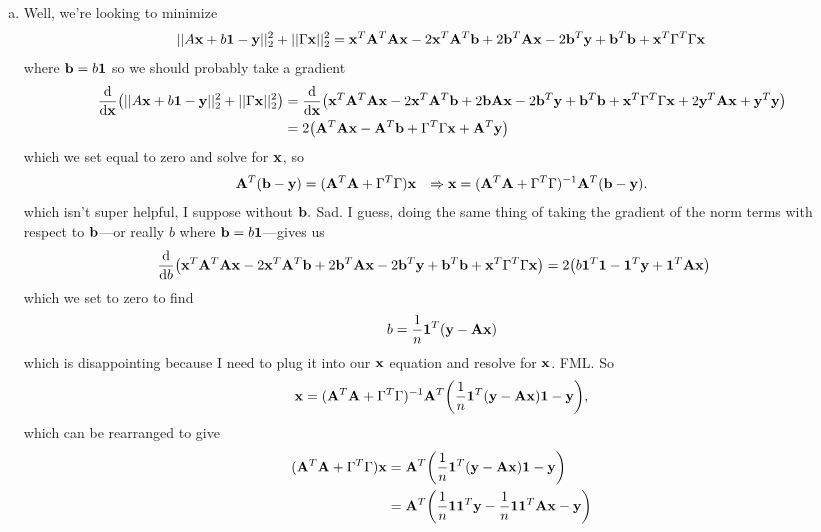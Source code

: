 \documentclass[12pt,letterpaper]{hmcpset}
\begin{document}
\begin{solution}
\begin{enumerate}[(a)]
		\item Well, we're looking to minimize \[ 
		||A{\bf x} + b{\bf 1} - {\bf y}||_2^2 + ||\Gamma{\bf x}||_2^2 = 
			\vb x^T \vb A^T \vb A \vb x - 2 \vb x^T \vb A^T \vb b 
			+2 \vb b^T \vb A \vb x - 2\vb b^T \vb y
			+ \vb b^T \vb b + \vb x^T \Gamma^T \Gamma \vb x
		\] where $\vb b = b \vb 1$ so we should probably take a gradient
		\begin{align*}
		 	\dv{\vb x}\qty (||A{\bf x} + b{\bf 1} - {\bf y}||_2^2 + ||\Gamma{\bf x}||_2^2) &= \dv{\vb x}\qty(\vb x^T \vb A^T \vb A \vb x - 2 \vb x^T \vb A^T \vb b 
			+2 \vb b \vb A \vb x - 2\vb b^T \vb y
			+ \vb b^T \vb b + \vb x^T \Gamma^T \Gamma \vb x + 2 \vb y^T \vb A \vb x + \vb y^T \vb y) \\
			&= 2 \qty(\vb A^T \vb A \vb x - \vb A^T \vb b + \Gamma^T \Gamma \vb x + \vb A^T \vb y) 
		 \end{align*} 
		 which we set equal to zero and solve for $\vb x$, so 
		 \begin{align*}
		 	&\vb A^T(\vb b - \vb y)  = (\vb A^T \vb A + \Gamma^T \Gamma)\vb x 
		 	&\Rightarrow \vb x = (\vb A^T \vb A + \Gamma^T \Gamma)^{-1}\vb A^T(\vb b - \vb y).
		 \end{align*}
		 which isn't super helpful, I suppose without $\vb b.$ Sad. I guess, doing the same thing of taking the gradient of the norm terms with respect to $\vb b$---or really $b$ where $\vb b = b \vb 1$---gives us
		 \begin{align*}
		 	\dv{b}\qty( \vb x^T \vb A^T \vb A \vb x - 2 \vb x^T \vb A^T \vb b 
			+2 \vb b^T \vb A \vb x - 2\vb b^T \vb y
			+ \vb b^T \vb b + \vb x^T \Gamma^T \Gamma \vb x ) 
			 &= 2\qty( b \vb 1^T \vb 1 - \vb 1^T \vb y + \vb 1^T \vb A \vb x )
		 \end{align*}
		 which we set to zero to find 
		 \begin{align*}
		 	 b = \frac1n \vb 1^T(\vb y - \vb A \vb x)
		 \end{align*}
		 which is disappointing because I need to plug it into our $\vb x$ equation and resolve for $\vb x$. FML.  So 
		 \begin{align*}
		 	\vb x = (\vb A^T \vb A + \Gamma^T \Gamma)^{-1} \vb A^T \qty( \frac1n \vb 1^T(\vb y - \vb A \vb x) \vb 1 - \vb y),
		 \end{align*}
		 which can be rearranged to give 
		 \begin{align*}
		(\vb A^T \vb A + \Gamma^T \Gamma) \vb x &= \vb A^T \qty( \frac1n \vb 1^T(\vb y - \vb A \vb x) \vb 1 - \vb y) \\
		&= \vb A^T \qty( \frac1n \vb 1 \vb 1^T \vb y - \frac1n \vb 1 \vb 1^T \vb A \vb x - \vb y ) \\

\end{align*}
\end{enumerate}
\end{solution}
\end{document}
